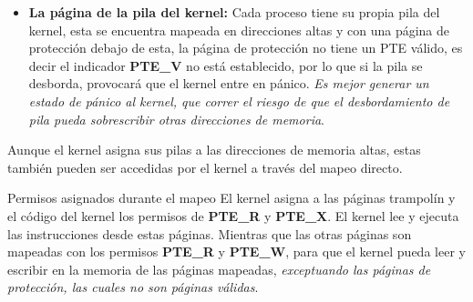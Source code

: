 \documentclass{libs/ufc_format}
\begin{document}
\begin{frame}{}
  \begin{itemize}
    \item \textbf{La página de la pila del kernel:} Cada proceso tiene su propia pila del kernel, esta se encuentra mapeada en direcciones altas y con una página de protección debajo de esta, la página de protección no tiene un PTE válido, es decir el indicador \textbf{PTE\_V} no está establecido, por lo que si la pila se desborda, provocará que el kernel entre en pánico. \emph{Es mejor generar un estado de pánico al kernel, que correr el riesgo de que el desbordamiento de pila pueda sobrescribir otras direcciones de memoria}. \cite{xv6_book}
  \end{itemize}

  \vspace{0.2cm}

  Aunque el kernel asigna sus pilas a las direcciones de memoria altas, estas también pueden ser accedidas por el kernel a través del mapeo directo.
\end{frame}
\begin{frame}{Permisos asignados durante el mapeo}
  El kernel asigna a las páginas trampolín y el código del kernel los permisos de \textbf{PTE\_R} y\textbf{ PTE\_X}. El kernel lee y ejecuta las instrucciones desde estas páginas. Mientras que las otras páginas son mapeadas con los permisos \textbf{PTE\_R} y \textbf{PTE\_W}, para que el kernel pueda leer y escribir en la memoria de las páginas mapeadas, \emph{exceptuando las páginas de protección, las cuales no son páginas válidas}. \cite{xv6_book}
\end{frame}
\end{document}

